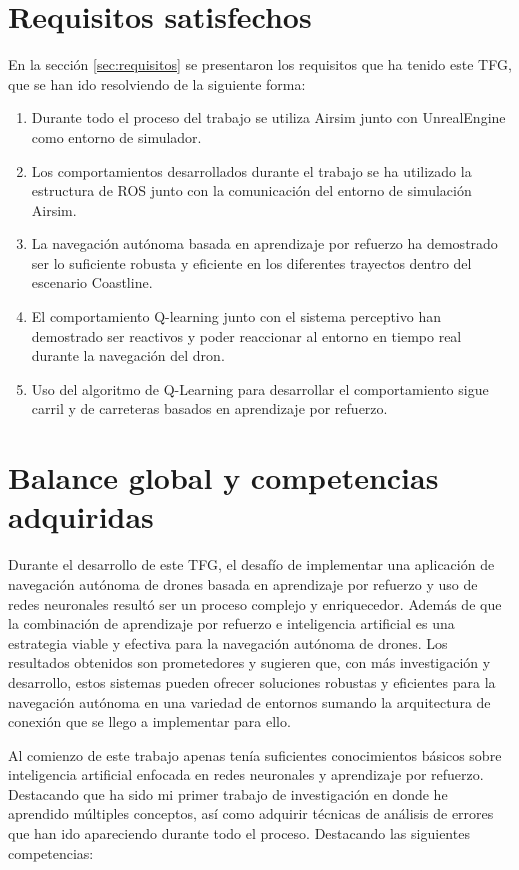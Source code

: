 \section{Requisitos satisfechos}
\label{requisitos_satisfechos}

En la sección \ref{sec:requisitos} se presentaron los requisitos que ha tenido este TFG, que se han ido resolviendo 
de la siguiente forma: 

\begin{enumerate}
    \item Durante todo el proceso del trabajo se utiliza Airsim junto con UnrealEngine como entorno de simulador.
    \item Los comportamientos desarrollados durante el trabajo se ha utilizado la estructura de ROS junto con la comunicación
    del entorno de simulación Airsim. 
    \item La navegación autónoma basada en aprendizaje por refuerzo ha demostrado ser lo suficiente robusta y eficiente en los
    diferentes trayectos dentro del escenario Coastline. 
    \item El comportamiento Q-learning junto con el sistema perceptivo han demostrado ser reactivos y poder reaccionar al entorno en tiempo real
    durante la navegación del dron.
    \item Uso del algoritmo de Q-Learning para desarrollar el comportamiento sigue carril y de carreteras basados en aprendizaje por 
    refuerzo.
\end{enumerate}


\section{Balance global y competencias adquiridas}
\label{balance_global_competencias_adquiridas}
Durante el desarrollo de este TFG, el desafío de implementar una aplicación de navegación autónoma de drones basada en
aprendizaje por refuerzo y uso de redes neuronales resultó ser un proceso complejo y enriquecedor. Además de que la
combinación de aprendizaje por refuerzo e inteligencia artificial es una estrategia viable y efectiva para la
navegación autónoma de drones. Los resultados obtenidos son prometedores y sugieren que, con más investigación y
desarrollo, estos sistemas pueden ofrecer soluciones robustas y eficientes para la navegación autónoma en una variedad
de entornos sumando la arquitectura de conexión que se llego a implementar para ello. 

Al comienzo de este trabajo apenas tenía suficientes conocimientos básicos sobre inteligencia artificial enfocada en
redes neuronales y aprendizaje por refuerzo. Destacando que ha sido mi primer trabajo de investigación en donde he
aprendido múltiples conceptos, así como adquirir técnicas de análisis de errores que han ido apareciendo durante todo
el proceso. Destacando las siguientes competencias: 

